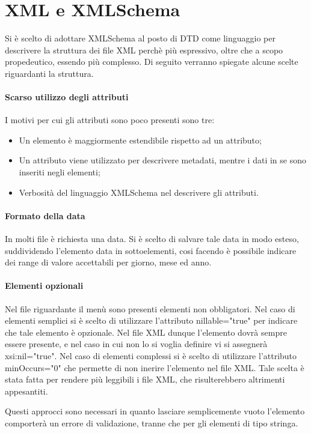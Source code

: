 \section{XML e XMLSchema}
Si è scelto di adottare XMLSchema al posto di DTD come linguaggio per descrivere la struttura dei file XML perchè più espressivo, oltre che a scopo propedeutico, essendo più complesso. Di seguito verranno spiegate alcune scelte riguardanti la struttura.

\paragraph{Scarso utilizzo degli attributi}

I motivi per cui gli attributi sono poco presenti sono tre:
\begin{itemize}
\item Un elemento è maggiormente estendibile rispetto ad un attributo;
\item Un attributo viene utilizzato per descrivere metadati, mentre i dati in se sono inseriti negli elementi;
\item Verbosità del linguaggio XMLSchema nel descrivere gli attributi.
\end{itemize}

\paragraph{Formato della data}
In molti file è richiesta una data. Si è scelto di salvare tale data in modo esteso, suddividendo l'elemento data in sottoelementi, cosi facendo è possibile indicare dei range di valore accettabili per giorno, mese ed anno.

\paragraph{Elementi opzionali}
Nel file riguardante il menù sono presenti elementi non obbligatori. Nel caso di elementi semplici si è scelto di utilizzare l'attributo nillable="true" per indicare che tale elemento è opzionale. Nel file XML dunque l'elemento dovrà sempre essere presente, e nel caso in cui non lo si voglia definire vi si assegnerà xsi:nil="true".  
Nel caso di elementi complessi si è scelto di utilizzare l'attributo minOccurs="0" che permette di non inerire l'elemento nel file XML. Tale scelta è stata fatta per rendere più leggibili i file XML, che risulterebbero altrimenti appesantiti.

Questi approcci sono necessari in quanto lasciare semplicemente vuoto l'elemento comporterà un errore di validazione, tranne che per gli elementi di tipo stringa.

